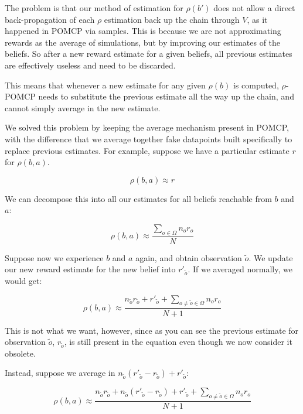 The problem is that our method of estimation for $\rho(b')$ does not allow a direct back-propagation
of each $\rho$ estimation back up the chain through $V$, as it happened in POMCP via samples. This
is because we are not approximating rewards as the average of simulations, but by improving our
estimates of the beliefs. So after a new reward estimate for a given beliefs, all previous estimates
are effectively useless and need to be discarded.

This means that whenever a new estimate for any given $\rho(b)$ is computed, $\rho$-POMCP needs to
substitute the previous estimate all the way up the chain, and cannot simply average in the new
estimate.

We solved this problem by keeping the average mechanism present in POMCP, with the difference that
we average together fake datapoints built specifically to replace previous estimates. For
example, suppose we have a particular estimate $r$ for $\rho(b, a)$.

%

\[ \rho(b,a) \approx r \]

We can decompose this into all our estimates for all beliefs reachable from $b$ and $a$:

\[ \rho(b,a) \approx \frac{\sum_{o\in\Omega} n_o r_o}{N} \]

Suppose now we experience $b$ and $a$ again, and obtain observation $\tilde{o}$. We update our new
reward estimate for the new belief into $r'_{\tilde{o}}$. If we averaged normally, we would get:

\[ \rho(b,a) \approx \frac{ n_{\tilde{o}} r_{\tilde{o}} + r'_{\tilde{o}} +
\sum_{o \neq \tilde{o} \in \Omega} n_o r_o}{N+1} \]

This is not what we want, however, since as you can see the previous estimate for observation
$\tilde{o}$, $r_{\tilde{o}}$, is still present in the equation even though we now consider it
obsolete.

Instead, suppose we average in $n_{\tilde{o}}(r'_{\tilde{o}} - r_{\tilde{o}}) + r'_{\tilde{o}}$:

\[ \rho(b,a) \approx \frac{ n_{\tilde{o}} r_{\tilde{o}} + n_{\tilde{o}}(r'_{\tilde{o}} -
r_{\tilde{o}}) + r'_{\tilde{o}} +
\sum_{o \neq \tilde{o} \in \Omega} n_o r_o}{N+1} \]

